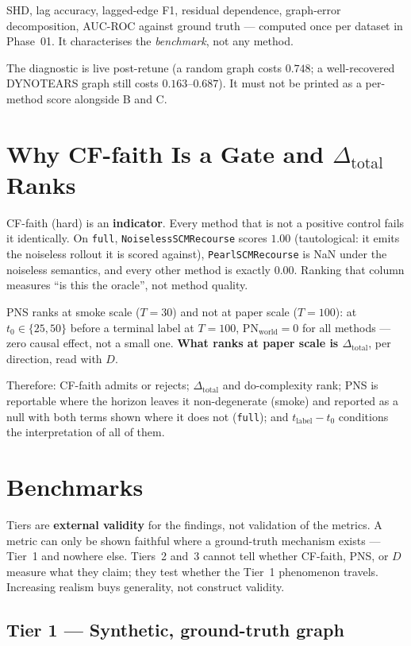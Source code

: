 \documentclass[11pt]{article}
\newcommand{\Deltatotal}{\Delta_{\mathrm{total}}}
\begin{document}
SHD, lag accuracy, lagged-edge F1, residual dependence, graph-error
decomposition, AUC-ROC against ground truth --- computed once per dataset
in Phase~01. It characterises the \emph{benchmark}, not any method.

The diagnostic is live post-retune (a random graph costs $0.748$; a
well-recovered DYNOTEARS graph still costs $0.163$--$0.687$). It must not
be printed as a per-method score alongside B and C.

\section{Why CF-faith Is a Gate and $\Deltatotal$ Ranks}

CF-faith (hard) is an \textbf{indicator}. Every method that is not a
positive control fails it identically. On \texttt{full},
\texttt{NoiselessSCMRecourse} scores $1.00$ (tautological: it emits the
noiseless rollout it is scored against), \texttt{PearlSCMRecourse} is
NaN under the noiseless semantics, and every other method is exactly
$0.00$. Ranking that column measures ``is this the oracle'', not method
quality.

PNS ranks at smoke scale ($T = 30$) and not at paper scale ($T = 100$):
at $t_0 \in \{25, 50\}$ before a terminal label at $T = 100$,
$\mathrm{PN}_{\mathrm{world}} = 0$ for all methods --- zero causal
effect, not a small one. \textbf{What ranks at paper scale is
$\Deltatotal$}, per direction, read with $D$.

Therefore: CF-faith admits or rejects; $\Deltatotal$ and do-complexity
rank; PNS is reportable where the horizon leaves it non-degenerate
(smoke) and reported as a null with both terms shown where it does not
(\texttt{full}); and $t_{\mathrm{label}} - t_0$ conditions the
interpretation of all of them.

\section{Benchmarks}

Tiers are \textbf{external validity} for the findings, not validation of
the metrics. A metric can only be shown faithful where a ground-truth
mechanism exists --- Tier~1 and nowhere else. Tiers~2 and~3 cannot tell
whether CF-faith, PNS, or $D$ measure what they claim; they test whether
the Tier~1 phenomenon travels. Increasing realism buys generality, not
construct validity.

\subsection{Tier 1 --- Synthetic, ground-truth graph}
\end{document}
